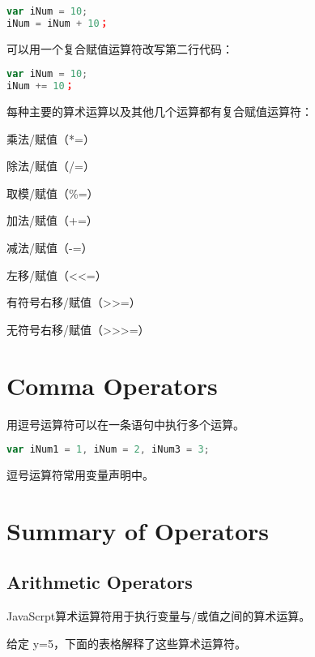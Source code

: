 \begin{lstlisting}[language=JavaScript]
var iNum = 10;
iNum = iNum + 10；
\end{lstlisting}

可以用一个复合赋值运算符改写第二行代码：

\begin{lstlisting}[language=JavaScript]
var iNum = 10;
iNum += 10；
\end{lstlisting}

每种主要的算术运算以及其他几个运算都有复合赋值运算符：

\begin{compactitem}
\item 乘法/赋值（*=）
\item 除法/赋值（/=）
\item 取模/赋值（\%=）
\item 加法/赋值（+=）
\item 减法/赋值（-=）
\item 左移/赋值（<\/<=）
\item 有符号右移/赋值（>\/>=）
\item 无符号右移/赋值（>\/>\/>=）
\end{compactitem}





\chapter{Comma Operators}

用逗号运算符可以在一条语句中执行多个运算。

\begin{lstlisting}[language=JavaScript]
var iNum1 = 1, iNum = 2, iNum3 = 3;
\end{lstlisting}

逗号运算符常用变量声明中。

\chapter{Summary of Operators}

\section{Arithmetic Operators}


JavaScrpt算术运算符用于执行变量与/或值之间的算术运算。

给定 y=5，下面的表格解释了这些算术运算符。


